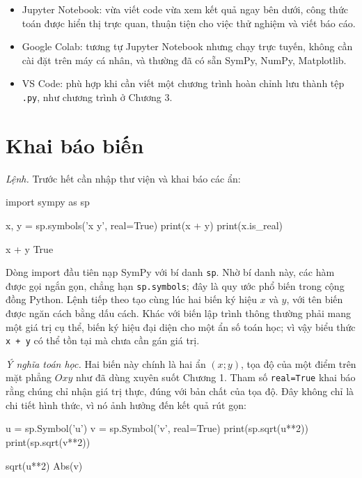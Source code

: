 \documentclass[12pt,a4paper]{report}
\begin{document}
\begin{itemize}
\item Jupyter Notebook: vừa viết code vừa xem kết quả ngay bên dưới, công thức toán được hiển thị trực quan, thuận tiện cho việc thử nghiệm và viết báo cáo.
\item Google Colab: tương tự Jupyter Notebook nhưng chạy trực tuyến, không cần cài đặt trên máy cá nhân, và thường đã có sẵn SymPy, NumPy, Matplotlib.
\item VS Code: phù hợp khi cần viết một chương trình hoàn chỉnh lưu thành tệp \texttt{.py}, như chương trình ở Chương 3.
\end{itemize}

\section{Khai báo biến}
\label{sec:2.3}

\textit{Lệnh.} Trước hết cần nhập thư viện và khai báo các ẩn:

\begin{madoanbox}
import sympy as sp

x, y = sp.symbols('x y', real=True)
print(x + y)
print(x.is_real)
\end{madoanbox}

\begin{ketquabox}
x + y
True
\end{ketquabox}

Dòng import đầu tiên nạp SymPy với bí danh \texttt{sp}. Nhờ bí danh này, các hàm được gọi ngắn gọn, chẳng hạn \texttt{sp.symbols}; đây là quy ước phổ biến trong cộng đồng Python. Lệnh tiếp theo tạo cùng lúc hai biến ký hiệu $x$ và $y$, với tên biến được ngăn cách bằng dấu cách. Khác với biến lập trình thông thường phải mang một giá trị cụ thể, biến ký hiệu đại diện cho một ẩn số toán học; vì vậy biểu thức \texttt{x + y} có thể tồn tại mà chưa cần gán giá trị.

\textit{Ý nghĩa toán học.} Hai biến này chính là hai ẩn $(x;y)$, tọa độ của một điểm trên mặt phẳng $Oxy$ như đã dùng xuyên suốt Chương 1. Tham số \texttt{real=True} khai báo rằng chúng chỉ nhận giá trị thực, đúng với bản chất của tọa độ. Đây không chỉ là chi tiết hình thức, vì nó ảnh hưởng đến kết quả rút gọn:

\begin{madoanbox}
u = sp.Symbol('u')
v = sp.Symbol('v', real=True)
print(sp.sqrt(u**2))
print(sp.sqrt(v**2))
\end{madoanbox}

\begin{ketquabox}
sqrt(u**2)
Abs(v)
\end{ketquabox}
\end{document}
